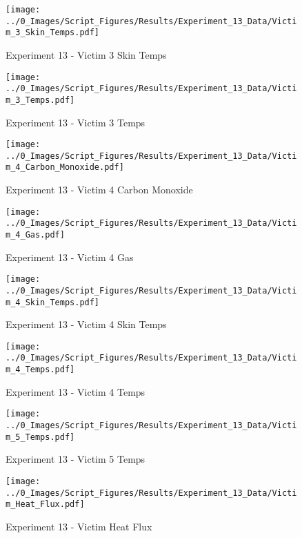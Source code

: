 	\begin{figure}[H]
		\centering
		\texttt{[image: ../0\_Images/Script\_Figures/Results/Experiment\_13\_Data/Victim\_3\_Skin\_Temps.pdf]}
		\caption[]{Experiment 13 - Victim 3 Skin Temps}
	\end{figure}
 
	\clearpage

	\begin{figure}[H]
		\centering
		\texttt{[image: ../0\_Images/Script\_Figures/Results/Experiment\_13\_Data/Victim\_3\_Temps.pdf]}
		\caption[]{Experiment 13 - Victim 3 Temps}
	\end{figure}
 

	\begin{figure}[H]
		\centering
		\texttt{[image: ../0\_Images/Script\_Figures/Results/Experiment\_13\_Data/Victim\_4\_Carbon\_Monoxide.pdf]}
		\caption[]{Experiment 13 - Victim 4 Carbon Monoxide}
	\end{figure}
 
	\clearpage

	\begin{figure}[H]
		\centering
		\texttt{[image: ../0\_Images/Script\_Figures/Results/Experiment\_13\_Data/Victim\_4\_Gas.pdf]}
		\caption[]{Experiment 13 - Victim 4 Gas}
	\end{figure}
 

	\begin{figure}[H]
		\centering
		\texttt{[image: ../0\_Images/Script\_Figures/Results/Experiment\_13\_Data/Victim\_4\_Skin\_Temps.pdf]}
		\caption[]{Experiment 13 - Victim 4 Skin Temps}
	\end{figure}
 
	\clearpage

	\begin{figure}[H]
		\centering
		\texttt{[image: ../0\_Images/Script\_Figures/Results/Experiment\_13\_Data/Victim\_4\_Temps.pdf]}
		\caption[]{Experiment 13 - Victim 4 Temps}
	\end{figure}
 

	\begin{figure}[H]
		\centering
		\texttt{[image: ../0\_Images/Script\_Figures/Results/Experiment\_13\_Data/Victim\_5\_Temps.pdf]}
		\caption[]{Experiment 13 - Victim 5 Temps}
	\end{figure}
 
	\clearpage

	\begin{figure}[H]
		\centering
		\texttt{[image: ../0\_Images/Script\_Figures/Results/Experiment\_13\_Data/Victim\_Heat\_Flux.pdf]}
		\caption[]{Experiment 13 - Victim Heat Flux}
	\end{figure}
 

